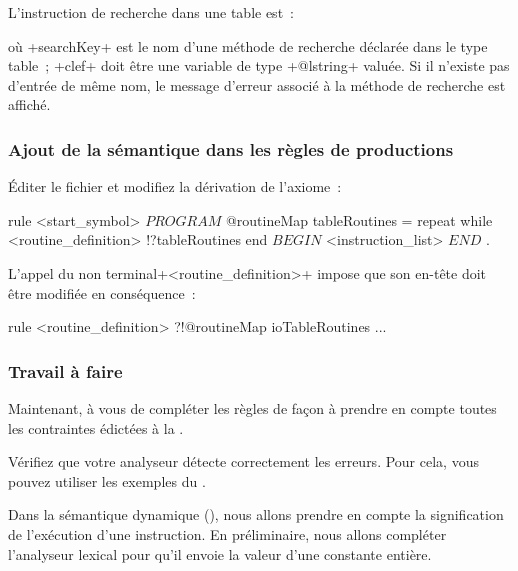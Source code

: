 L'instruction de recherche dans une table est~:
\begin{galgas4}
\end{galgas4}
où \ggsq+searchKey+ est le nom d'une méthode de recherche déclarée dans le type table~; \ggsq+clef+ doit être une variable de type \ggsq+@lstring+ valuée. Si il n'existe pas d'entrée de même nom, le message d'erreur associé à la méthode de recherche est affiché.

\subsubsection{Ajout de la sémantique dans les règles de productions}
Éditer le fichier  et modifiez la dérivation de l'axiome~:

\begin{galgas4}
rule <start_symbol> {
  $PROGRAM$
  @routineMap tableRoutines = {}
  repeat
  while
    <routine_definition> !?tableRoutines
  end
  $BEGIN$
  <instruction_list>
  $END$
  $.$
}
\end{galgas4}

L'appel du non terminal\ggsq+<routine_definition>+ impose que son en-tête doit être modifiée en conséquence~:
\begin{galgas4}
rule <routine_definition> ?!@routineMap ioTableRoutines {
  ...
}
\end{galgas4}

\subsubsection{Travail à faire}
Maintenant, à vous de compléter les règles de façon à prendre en compte toutes les contraintes édictées à la .

Vérifiez que votre analyseur détecte correctement les erreurs. Pour cela, vous pouvez utiliser les exemples du .









Dans la sémantique dynamique (), nous allons prendre en compte la signification de l'exécution d'une instruction. En préliminaire, nous allons compléter l'analyseur lexical pour qu'il envoie la valeur d'une constante entière.

